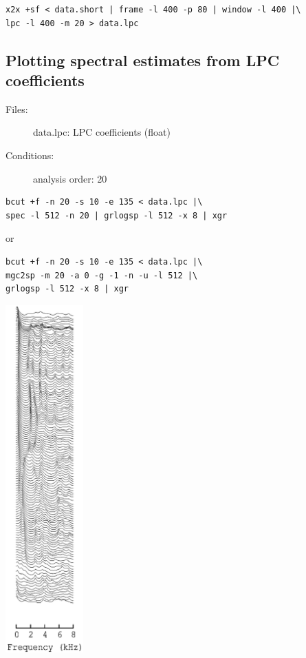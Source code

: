 \documentclass[a4paper,10pt]{article}
\begin{document}
\begin{verbatim}
x2x +sf < data.short | frame -l 400 -p 80 | window -l 400 |\
lpc -l 400 -m 20 > data.lpc
\end{verbatim}

\subsection{Plotting spectral estimates from LPC coefficients}

\begin{description}
\item[Files:]
  data.lpc: LPC coefficients (float)
\item[Conditions:]
  analysis order: 20
\end{description}

\begin{verbatim}
bcut +f -n 20 -s 10 -e 135 < data.lpc |\
spec -l 512 -n 20 | grlogsp -l 512 -x 8 | xgr
\end{verbatim}

or

\begin{verbatim}
bcut +f -n 20 -s 10 -e 135 < data.lpc |\
mgc2sp -m 20 -a 0 -g -1 -n -u -l 512 |\
grlogsp -l 512 -x 8 | xgr
\end{verbatim}

\includegraphics[width=3cm]{eps/data.lpc.grlogsp.eps}
\end{document}
